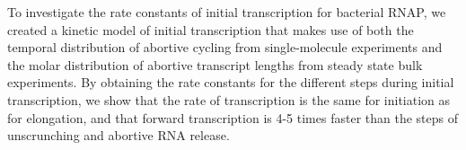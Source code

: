 To investigate the rate constants of initial transcription for bacterial RNAP,
we created a kinetic model of initial transcription that makes use of both the
temporal distribution of abortive cycling from single-molecule experiments
and the molar distribution of abortive transcript lengths from steady state
bulk experiments. By obtaining the rate constants for the different steps
during initial transcription, we show that the rate of transcription is the
same for initiation as for elongation, and that forward transcription is 4-5
times faster than the steps of unscrunching and abortive RNA release.





